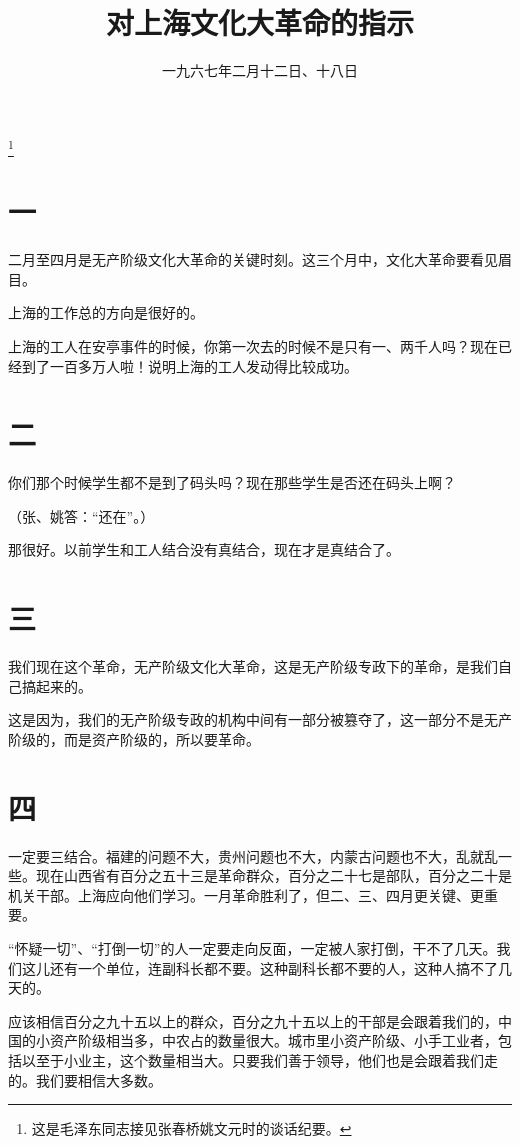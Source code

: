 
\title{对上海文化大革命的指示}
\date{一九六七年二月十二日、十八日}
\thanks{这是毛泽东同志接见张春桥姚文元时的谈话纪要。}
\maketitle


\section*{一}

二月至四月是无产阶级文化大革命的关键时刻。这三个月中，文化大革命要看见眉目。

上海的工作总的方向是很好的。

上海的工人在安亭事件的时候，你第一次去的时候不是只有一、两千人吗？现在已经到了一百多万人啦！说明上海的工人发动得比较成功。

\section*{二}

你们那个时候学生都不是到了码头吗？现在那些学生是否还在码头上啊？

（张、姚答：“还在”。）

那很好。以前学生和工人结合没有真结合，现在才是真结合了。

\section*{三}

我们现在这个革命，无产阶级文化大革命，这是无产阶级专政下的革命，是我们自己搞起来的。

这是因为，我们的无产阶级专政的机构中间有一部分被篡夺了，这一部分不是无产阶级的，而是资产阶级的，所以要革命。

\section*{四}

一定要三结合。福建的问题不大，贵州问题也不大，内蒙古问题也不大，乱就乱一些。现在山西省有百分之五十三是革命群众，百分之二十七是部队，百分之二十是机关干部。上海应向他们学习。一月革命胜利了，但二、三、四月更关键、更重要。

“怀疑一切”、“打倒一切”的人一定要走向反面，一定被人家打倒，干不了几天。我们这儿还有一个单位，连副科长都不要。这种副科长都不要的人，这种人搞不了几天的。

应该相信百分之九十五以上的群众，百分之九十五以上的干部是会跟着我们的，中国的小资产阶级相当多，中农占的数量很大。城市里小资产阶级、小手工业者，包括以至于小业主，这个数量相当大。只要我们善于领导，他们也是会跟着我们走的。我们要相信大多数。

